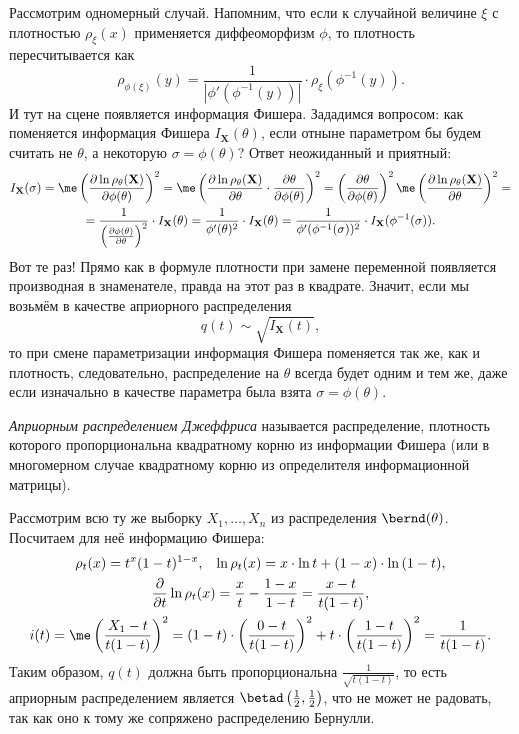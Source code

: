 Рассмотрим одномерный случай. Напомним, что если к случайной величине $\xi$ с плотностью $\rho_{\xi}(x)$ применяется диффеоморфизм $\phi$, то плотность пересчитывается как
\[
\rho_{\phi(\xi)}(y) = \frac{1}{\left|\phi'(\phi^{-1}(y))\right|} \cdot \rho_{\xi}(\phi^{-1}(y)).
\]
И тут на сцене появляется информация Фишера. Зададимся вопросом: как поменяется информация Фишера $I_{\mathbf X}(\theta)$, если отныне параметром бы будем считать не $\theta$, а некоторую $\sigma = \phi(\theta)$? Ответ неожиданный и приятный:
\begin{gather*}
    I_{\mathbf X}(\sigma) = \me \left(\frac{\partial \ln{\rho_{\theta}(\mathbf X)}}{\partial \phi(\theta)} \right)^2 = \me \left(\frac{\partial \ln{\rho_{\theta}(\mathbf X)}}{\partial \theta}\cdot \frac{\partial \theta}{\partial \phi(\theta)} \right)^2 = \left(\frac{\partial \theta}{\partial \phi(\theta)}\right)^2 \me \left(\frac{\partial \ln{\rho_{\theta}(\mathbf X)}}{\partial \theta}\right)^2=\\
    = \frac{1}{\left(\frac{\partial \phi(\theta)}{\partial \theta}\right)^2} \cdot I_{\mathbf X}(\theta) = \frac{1}{\phi'(\theta)^2} \cdot I_{\mathbf X}(\theta) = \frac{1}{\phi'(\phi^{-1}(\sigma))^2} \cdot I_{\mathbf X}(\phi^{-1}(\sigma)).
\end{gather*}
Вот те раз! Прямо как в формуле плотности при замене переменной появляется производная в знаменателе, правда на этот раз в квадрате. Значит, если мы возьмём в качестве априорного распределения
\[
q(t) \sim \sqrt{I_{\mathbf X}(t)},
\]
то при смене параметризации информация Фишера поменяется так же, как и плотность, следовательно, распределение на $\theta$ всегда будет одним и тем же, даже если изначально в качестве параметра была взята $\sigma = \phi(\theta)$.

\begin{definition}
    \textit{Априорным распределением Джеффриса} называется распределение, плотность которого пропорциональна квадратному корню из информации Фишера (или в многомерном случае квадратному корню из определителя информационной матрицы).
\end{definition}

\begin{example}\label{improper_for_bin}
Рассмотрим всю ту же выборку $X_1, \ldots, X_n$ из распределения $\bernd(\theta)$. Посчитаем для неё информацию Фишера:
\begin{gather*}
    \rho_t(x) = t^x (1 - t)^{1 - x},\;\;\;
    \ln{\rho_{t}(x)} = x \cdot \ln{t} + \left(1 - x\right) \cdot \ln{(1 - t)},\\
    \frac{\partial}{\partial t} \ln{\rho_{t}(x)} = \frac{x}{t} - \frac{1-x}{1 - t} = \frac{x - t}{t(1 - t)},\\
    i(t) = \me \left(\frac{X_1 - t}{t(1 - t)}\right)^2 = (1 - t) \cdot \left(\frac{0 - t}{t(1 - t)}\right)^2 + t \cdot \left(\frac{1 - t}{t(1 - t)}\right)^2 = \frac{1}{t(1 - t)}.
\end{gather*}
Таким образом, $q(t)$ должна быть пропорциональна $\frac{1}{\sqrt{t(1 - t)}}$, то есть априорным распределением является $\betad\left(\frac{1}{2}, \frac{1}{2}\right)$, что не может не радовать, так как оно к тому же сопряжено распределению Бернулли.
\end{example}

